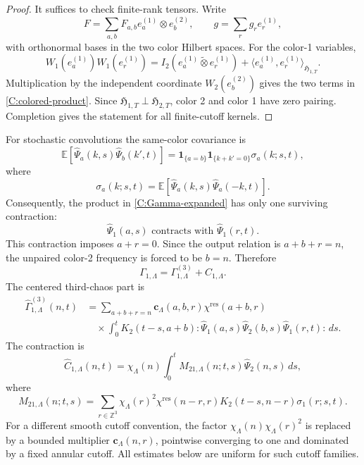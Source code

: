 \documentclass[10pt]{amsart}
\numberwithin{equation}{section}
\theoremstyle{plain}
\theoremstyle{definition}
\theoremstyle{remark}
\newcommand{\Z}{\mathbb{Z}}
\newcommand{\E}{\mathbb{E}}
\newcommand{\wh}{\widehat}
\newcommand{\HH}{\mathfrak{H}}
\begin{document}
\begin{proof}
It suffices to check finite-rank tensors.  Write
\[
        F=\sum_{a,b}F_{a,b}e_a^{(1)}\otimes e_b^{(2)},
        \qquad
        g=\sum_r g_r e_r^{(1)},
\]
with orthonormal bases in the two color Hilbert spaces.  For the color-1 variables,
\[
        W_1(e_a^{(1)})W_1(e_r^{(1)})
        =I_2(e_a^{(1)}\widetilde\otimes e_r^{(1)})
        +\langle e_a^{(1)},e_r^{(1)}\rangle_{\HH_{1,T}}.
\]
Multiplication by the independent coordinate \(W_2(e_b^{(2)})\) gives the two terms in \eqref{C:colored-product}.  Since \(\HH_{1,T}\perp\HH_{2,T}\), color 2 and color 1 have zero pairing.  Completion gives the statement for all finite-cutoff kernels.
\end{proof}

For stochastic convolutions the same-color covariance is
\begin{equation}\label{C:cov-def}
        \E[\wh\Psi_a(k,s)\wh\Psi_b(k',t)]
        =\mathbf 1_{\{a=b\}}\mathbf 1_{\{k+k'=0\}}\sigma_a(k;s,t),
\end{equation}
where
\begin{equation}\label{C:sigma-def}
        \sigma_a(k;s,t)=\E[\wh\Psi_a(k,s)\wh\Psi_a(-k,t)].
\end{equation}
Consequently, the product in \eqref{C:Gamma-expanded} has only one surviving contraction:
\[
        \wh\Psi_1(a,s)\text{ contracts with }\wh\Psi_1(r,t).
\]
This contraction imposes \(a+r=0\).  Since the output relation is \(a+b+r=n\), the unpaired color-2 frequency is forced to be \(b=n\).  Therefore
\begin{equation}\label{C:Gamma-decomposition}
        \Gamma_{1,\Lambda}=\Gamma_{1,\Lambda}^{(3)}+C_{1,\Lambda}.
\end{equation}
The centered third-chaos part is
\begin{equation}\label{C:third-chaos-def}
\begin{aligned}
        \wh\Gamma_{1,\Lambda}^{(3)}(n,t)
        & =
        \sum_{a+b+r=n}
        \mathbf c_\Lambda(a,b,r)
        \chi^{\mathrm{res}}(a+b,r)                                      \\
        &\quad\times
        \int_0^tK_2(t-s,a+b)
        :\wh\Psi_1(a,s)\wh\Psi_2(b,s)\wh\Psi_1(r,t):\,ds.
\end{aligned}
\end{equation}
The contraction is
\begin{equation}\label{C:contraction-cutoff-form}
        \wh C_{1,\Lambda}(n,t)
        =\chi_\Lambda(n)
        \int_0^t M_{21,\Lambda}(n;t,s)\wh\Psi_2(n,s)\,ds,
\end{equation}
where
\begin{equation}\label{C:M21-cutoff}
        M_{21,\Lambda}(n;t,s)
        =\sum_{r\in\Z^3}
        \chi_\Lambda(r)^2
        \chi^{\mathrm{res}}(n-r,r)
        K_2(t-s,n-r)\sigma_1(r;s,t).
\end{equation}
For a different smooth cutoff convention, the factor \(\chi_\Lambda(n)\chi_\Lambda(r)^2\) is replaced by a bounded multiplier \(\mathbf c_\Lambda(n,r)\), pointwise converging to one and dominated by a fixed annular cutoff.  All estimates below are uniform for such cutoff families.
\end{document}
